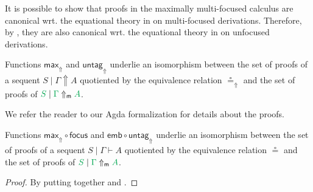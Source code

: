 \documentclass[runningheads]{llncs}
\newcommand{\green}[1]{{\color{Green}#1}}
\newcommand{\up}{\Uparrow}
\newcommand{\upm}{\Uparrow_{\mathsf{m}}}
\newcommand{\focus}{\mathsf{focus}}
\newcommand{\emb}{\mathsf{emb}}
\begin{document}
It is possible to show that proofs in the maximally multi-focused calculus are canonical wrt. the equational theory in  on multi-focused derivations. Therefore, by , they are also canonical wrt. the equational theory in  on unfocused derivations. 
\begin{theorem}\label{thm3}
  Functions $\mathsf{max}_\up$ and $\mathsf{untag}_\up$ underlie an isomorphism between the set of proofs of a sequent $S \mid \Gamma \up A$ quotiented by the equivalence relation $\circeq_\up$ and the set of proofs of $\green{S} \mid \green{\Gamma} \upm \green{A}$. %
\end{theorem}
We refer the reader to our Agda formalization for details about the proofs.
\begin{corollary}\label{cor}
  Functions $\mathsf{max}_\up\circ \focus$ and $\emb \circ \mathsf{untag}_\up$ underlie an isomorphism between the set of proofs of a sequent $S \mid \Gamma \vdash A$ quotiented by the equivalence relation $\circeq$ and the set of proofs of $\green{S} \mid \green{\Gamma} \upm \green{A}$. %
\end{corollary}
\begin{proof}
  By putting together  and .
\end{proof}
\end{document}
